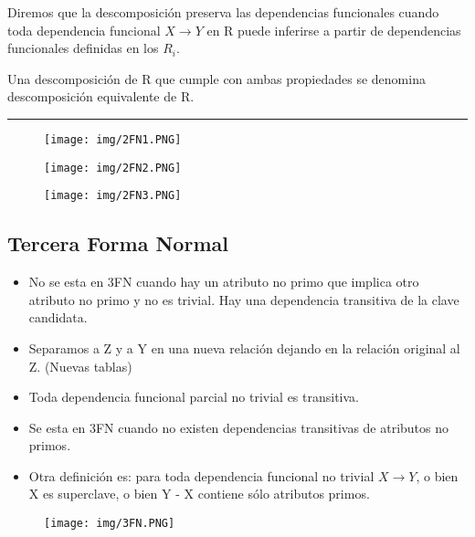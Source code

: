 \medskip
Diremos que la descomposición preserva las dependencias
funcionales cuando toda dependencia funcional $X \rightarrow Y$ en R
puede inferirse a partir de dependencias funcionales definidas en
los $R_i$.

\bigskip
Una descomposición de R que cumple con ambas propiedades se denomina descomposición equivalente de R.\\
\noindent\rule{\textwidth}{0.5pt}

\begin{figure}[!htb]
    \centering
    \texttt{[image: img/2FN1.PNG]}
\end{figure}

\begin{figure}[!htb]
    \centering
    \texttt{[image: img/2FN2.PNG]}
\end{figure}

\begin{figure}[!htb]
    \centering
    \texttt{[image: img/2FN3.PNG]}
\end{figure}

\subsection*{Tercera Forma Normal}
\begin{itemize}
\item No se esta en 3FN cuando hay un atributo no primo que implica otro atributo no primo y no es trivial. Hay una dependencia transitiva de la clave candidata.
\item Separamos a Z y a Y en una nueva relación dejando en la relación original al Z. (Nuevas tablas)
\item Toda dependencia funcional parcial no trivial es transitiva.
\item Se esta en 3FN cuando no existen dependencias transitivas de atributos no primos.
\item Otra definición es: para toda dependencia funcional no trivial $X \rightarrow Y$, o bien X es superclave, o bien Y - X contiene sólo atributos primos.
\end{itemize}

\begin{figure}[!htb]
    \centering
    \texttt{[image: img/3FN.PNG]}
\end{figure}

